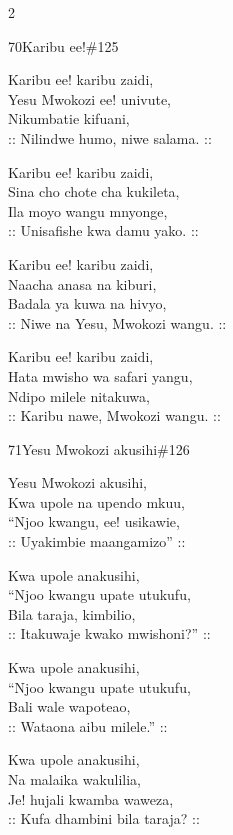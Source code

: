 \begin{multicols}{2}
\begin{hymn}{70}{Karibu ee!}{\#125}
\begin{stanza}
Karibu ee! karibu zaidi,\\
Yesu Mwokozi ee! univute,\\
Nikumbatie kifuani,\\
:: Nilindwe humo, niwe salama. ::
\end{stanza}
\begin{stanza}
Karibu ee! karibu zaidi,\\
Sina cho chote cha kukileta,\\
Ila moyo wangu mnyonge,\\
:: Unisafishe kwa damu yako. ::
\end{stanza}
\begin{stanza}
Karibu ee! karibu zaidi,\\
Naacha anasa na kiburi,\\
Badala ya kuwa na hivyo,\\
:: Niwe na Yesu, Mwokozi wangu. ::
\end{stanza}
\begin{stanza}
Karibu ee! karibu zaidi,\\
Hata mwisho wa safari yangu,\\
Ndipo milele nitakuwa,\\
:: Karibu nawe, Mwokozi wangu. ::
\end{stanza}
\end{hymn}

\begin{hymn}{71}{Yesu Mwokozi akusihi}{\#126}
\begin{stanza}
Yesu Mwokozi akusihi,\\
Kwa upole na upendo mkuu,\\
``Njoo kwangu, ee! usikawie,\\
:: Uyakimbie maangamizo'' ::
\end{stanza}
\begin{stanza}
Kwa upole anakusihi,\\
``Njoo kwangu upate utukufu,\\
Bila taraja, kimbilio,\\
:: Itakuwaje kwako mwishoni?'' ::
\end{stanza}
\begin{stanza}
Kwa upole anakusihi,\\
``Njoo kwangu upate utukufu,\\
Bali wale wapoteao,\\
:: Wataona aibu milele.'' ::
\end{stanza}
\begin{stanza}
Kwa upole anakusihi,\\
Na malaika wakulilia,\\
Je! hujali kwamba waweza,\\
:: Kufa dhambini bila taraja? ::
\end{stanza}
\end{hymn}


\end{multicols}
